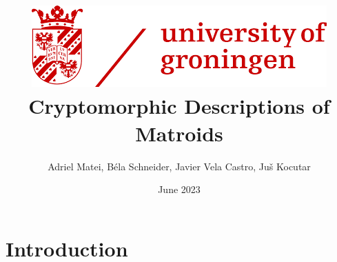\documentclass{article}
\title{ {\includegraphics[scale=0.5]{rug_logo.png}}\\
    \vspace{2cm}
    {Cryptomorphic Descriptions of Matroids} 
    }
\author{Adriel Matei, Béla Schneider, Javier Vela Castro, Juš Kocutar}
\date{June 2023}
\theoremstyle{plain}
\theoremstyle{definition}
\theoremstyle{remark}
\numberwithin{equation}{section}
\begin{document}
\maketitle


\newpage

\tableofcontents

\newpage
\section{Introduction}












\begin{appendices}
    
    
\end{appendices}

\nocite{*}


\end{document}
